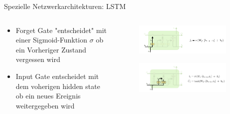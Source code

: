 \documentclass[aspectratio=1610, xcolor=dvipsnames, 9pt]{beamer}
\begin{document}
            
      \begin{frame}{Spezielle Netzwerkarchitekturen: LSTM}
        \begin{columns}
          \begin{column}{0.6\textwidth}
            \begin{itemize}              
              \item Forget Gate "entscheidet" mit einer Sigmoid-Funktion $\sigma$ ob ein Vorheriger Zustand vergessen wird \newline
              \item Input Gate entscheidet mit dem voherigen hidden state ob ein neues Ereignis weitergegeben wird
            \end{itemize}
          \end{column}
           \begin{column}{0.4\textwidth}
             \begin{figure}
               \centering
                           \includegraphics[width=0.9\textwidth]{images/LSTM_3.png}
               \end{figure}
               \begin{figure}
                \centering
                            \includegraphics[width=0.9\textwidth]{images/LSTM_4.png}
                \end{figure}
            

           \end{column}
        \end{columns}
      \end{frame} 
\end{document}
